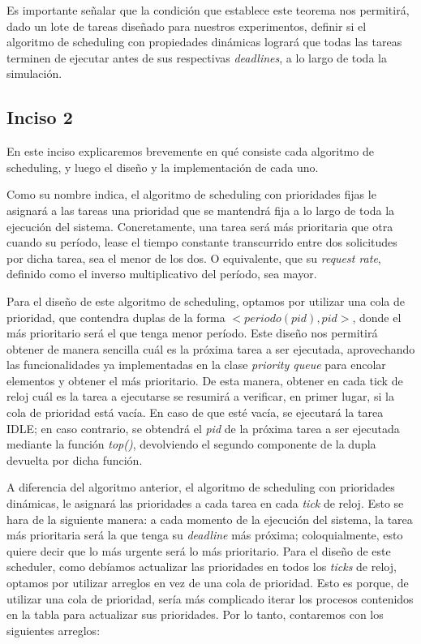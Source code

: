 Es importante se\~nalar que la condici\'on que establece este teorema nos permitir\'a, dado un lote de tareas dise\~nado para nuestros experimentos, definir 
si el algoritmo de scheduling con propiedades din\'amicas lograr\'a que todas las tareas terminen de ejecutar antes de sus respectivas \textit{deadlines}, a lo 
largo de toda la simulaci\'on.

\subsection*{Inciso 2}

En este inciso explicaremos brevemente en qu\'e consiste cada algoritmo de scheduling, y luego el dise\~no y la implementaci\'on de cada uno.

Como su nombre indica, el algoritmo de scheduling con prioridades fijas le asignar\'a a las tareas una prioridad que se mantendr\'a fija a lo largo de 
toda la ejecuci\'on del sistema. Concretamente, una tarea ser\'a m\'as prioritaria que otra cuando su per\'iodo, lease el tiempo constante transcurrido entre
dos solicitudes por dicha tarea, sea el menor de los dos. O equivalente, que su \textit{request rate}, definido como el inverso multiplicativo del per\'iodo,
sea mayor. 

Para el dise\~no de este algoritmo de scheduling, optamos por utilizar una cola de prioridad, que contendra duplas de la forma 
$<periodo(pid),pid>$, donde el m\'as prioritario ser\'a el que tenga menor per\'iodo. Este dise\~no nos permitir\'a obtener de manera sencilla cu\'al es
la pr\'oxima tarea a ser ejecutada, aprovechando las funcionalidades ya implementadas en la clase \textit{priority queue} para encolar elementos y obtener
el m\'as prioritario. De esta manera, obtener en cada tick de reloj cu\'al es la tarea a ejecutarse se resumir\'a a verificar, en primer lugar, si la 
cola de prioridad est\'a vac\'ia. En caso de que est\'e vac\'ia, se ejecutar\'a la tarea IDLE; en caso contrario, se obtendr\'a el \textit{pid} de la 
pr\'{o}xima tarea a ser ejecutada mediante la funci\'on \textit{top()}, devolviendo el segundo componente de la dupla devuelta por dicha funci\'on.

A diferencia del algoritmo anterior, el algoritmo de scheduling con prioridades din\'amicas, le asignar\'a las prioridades a cada tarea en cada
\textit{tick} de reloj. Esto se hara de la siguiente manera: a cada momento de la ejecuci\'on del sistema, la tarea m\'as prioritaria ser\'a la que
tenga su \textit{deadline} m\'as pr\'oxima; coloquialmente, esto quiere decir que lo m\'as urgente ser\'a lo m\'as prioritario. Para el dise\~no de
este scheduler, como deb\'iamos actualizar las prioridades en todos los \textit{ticks} de reloj, optamos por utilizar arreglos en vez de una cola de 
prioridad. Esto es porque, de utilizar una cola de prioridad, ser\'ia m\'as complicado iterar los procesos contenidos en la tabla para actualizar sus prioridades.
Por lo tanto, contaremos con los siguientes arreglos:

